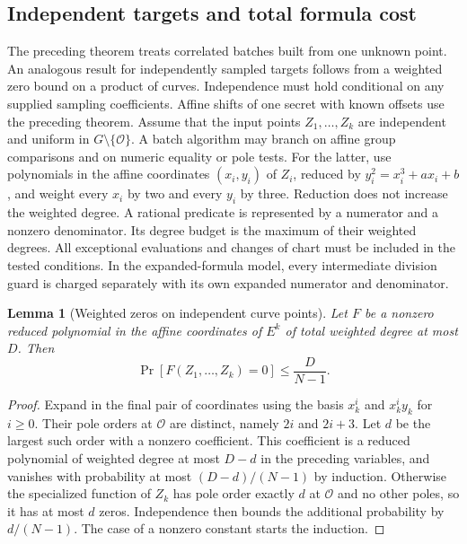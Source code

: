 \documentclass[11pt]{article}
\newtheorem{lemma}[theorem]{Lemma}
\newcommand{\OO}{\mathcal O}
\begin{document}
\subsection*{Independent targets and total formula cost}

The preceding theorem treats correlated batches built from one unknown point. An analogous result for independently sampled targets follows from a weighted zero bound on a product of curves. Independence must hold conditional on any supplied sampling coefficients. Affine shifts of one secret with known offsets use the preceding theorem. Assume that the input points \(Z_1,\ldots,Z_k\) are independent and uniform in \(G\setminus\{\OO\}\). A batch algorithm may branch on affine group comparisons and on numeric equality or pole tests. For the latter, use polynomials in the affine coordinates \((x_i,y_i)\) of \(Z_i\), reduced by \(y_i^2=x_i^3+ax_i+b\), and weight every \(x_i\) by two and every \(y_i\) by three. Reduction does not increase the weighted degree. A rational predicate is represented by a numerator and a nonzero denominator. Its degree budget is the maximum of their weighted degrees. All exceptional evaluations and changes of chart must be included in the tested conditions. In the expanded-formula model, every intermediate division guard is charged separately with its own expanded numerator and denominator.

\begin{lemma}[Weighted zeros on independent curve points]
Let \(F\) be a nonzero reduced polynomial in the affine coordinates of \(E^k\) of total weighted degree at most \(D\). Then
\[
   \Pr[F(Z_1,\ldots,Z_k)=0]\le \frac{D}{N-1}.
\]
\end{lemma}
\begin{proof}
Expand in the final pair of coordinates using the basis \(x_k^i\) and \(x_k^i y_k\) for \(i\ge0\). Their pole orders at \(\OO\) are distinct, namely \(2i\) and \(2i+3\). Let \(d\) be the largest such order with a nonzero coefficient. This coefficient is a reduced polynomial of weighted degree at most \(D-d\) in the preceding variables, and vanishes with probability at most \((D-d)/(N-1)\) by induction. Otherwise the specialized function of \(Z_k\) has pole order exactly \(d\) at \(\OO\) and no other poles, so it has at most \(d\) zeros. Independence then bounds the additional probability by \(d/(N-1)\). The case of a nonzero constant starts the induction.
\end{proof}
\end{document}
